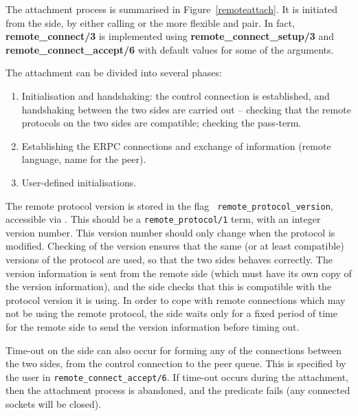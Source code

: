 The attachment process is summarised in Figure~\ref{remoteattach}. It is
initiated from the {\eclipse} side, by either calling
 or the more flexible 
and  pair. In fact, {\bf remote_connect/3} is implemented using {\bf
remote_connect_setup/3} and {\bf remote_connect_accept/6} with default
values for some of the arguments. 

The attachment can be divided into several phases: 

\begin{enumerate}
\item Initialisation and handshaking: the control connection is
established, and handshaking between the two sides are carried out --
checking that the remote protocols on the two sides are compatible;
checking the pass-term.
\item Establishing the ERPC connections and exchange of information
(remote language, {\eclipse} name for the peer).
\item User-defined initialisations.
\end{enumerate}

The remote protocol version is stored in the flag {\tt
remote_protocol_version}, accessible via . This
should be a {\tt remote_protocol/1} term, with an integer version
number. This version number should only change when the protocol is
modified. Checking of the version ensures that the same (or at
least compatible) versions of the protocol are used, so that the two sides
behaves correctly. The version information is sent from the remote side
(which must have its own copy of the version information), and the
{\eclipse} side checks that this is compatible with the protocol version it
is using. In order to cope with remote connections which may not be using
the remote protocol, the {\eclipse} side waits only for a fixed period of
time for the remote side to send the version information before timing out.

Time-out on the {\eclipse} side can also occur for forming any of the
connections between the two sides, from the control connection to the peer
queue. This is specified by the user in {\tt remote_connect_accept/6}. If
time-out occurs during the attachment, then the attachment process is
abandoned, and the predicate fails (any connected sockets will be closed).


